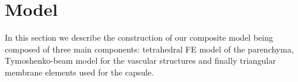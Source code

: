 \documentclass{llncs}
\newcommand{\TG}[1]{{\color{blue}\textbf{TG: #1}}}
\begin{document}
%
%
%
%



\section{Model} %

In this section we describe the construction of our composite model
being composed of three main components: tetrahedral FE model of the 
parenchyma, Tymoshenko-beam model for the vascular structures and finally 
triangular membrane elements used for the capsule.
\end{document}
